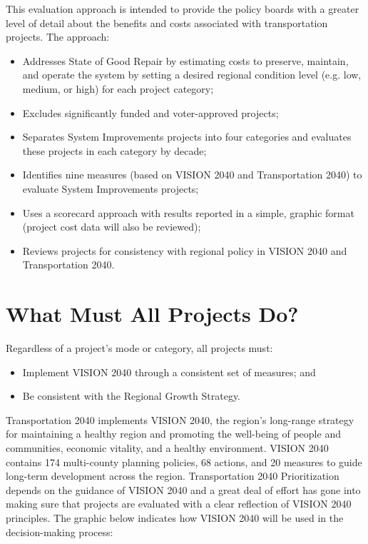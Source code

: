 \documentclass[10pt, letterpaper, final, twoside, onecolumn]{memoir}%
\begin{document}
This evaluation approach is intended to provide the policy boards with a greater level of detail about the benefits and costs associated with transportation projects. The approach:

\begin{itemize}
\item Addresses State of Good Repair by estimating costs to preserve, maintain, and operate the system by setting a desired regional condition level (e.g. low, medium, or high) for each project category;
\item Excludes significantly funded and voter-approved projects;
\item Separates System Improvements projects into four categories and evaluates these projects in each category by decade;
\item Identifies nine measures (based on VISION 2040 and Transportation 2040) to evaluate System Improvements projects;
\item Uses a scorecard approach with results reported in a simple, graphic format (project cost data will also be reviewed);
\item Reviews projects for consistency with regional policy in VISION 2040 and Transportation 2040.
\end{itemize}

\section{What Must All Projects Do?}
Regardless of a project's mode or category, all projects must:
\begin{itemize}
\item Implement VISION 2040 through a consistent set of measures; and
\item Be consistent with the Regional Growth Strategy.
\end{itemize}

Transportation 2040 implements VISION 2040, the region’s long-range strategy for maintaining a healthy region and promoting the well-being of people and communities, economic vitality, and a healthy environment. VISION 2040 contains 174 multi-county planning policies, 68 actions, and 20 measures to guide long-term development across the region. Transportation 2040 Prioritization depends on the guidance of VISION 2040 and a great deal of effort has gone into making sure that projects are evaluated with a clear reflection of VISION 2040 principles. The graphic below indicates how VISION 2040 will be used in the decision-making process:
\end{document}
